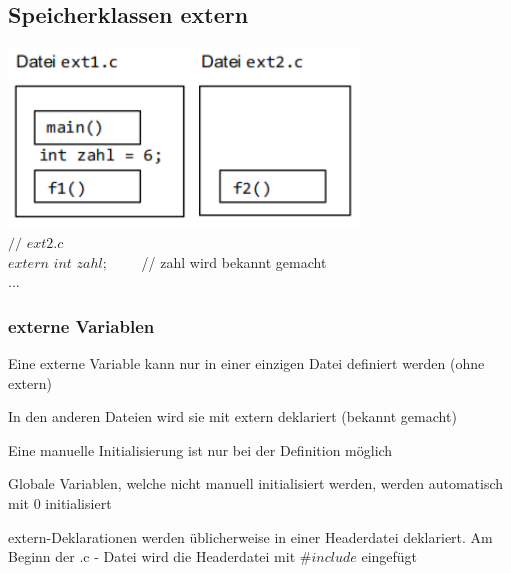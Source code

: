 			\subsection{Speicherklassen extern}
				\begin{minipage}[c]{9 cm}
					\includegraphics[width=0.7\textwidth]{pics/Speicherklasse_extern.png}\\
					$//$ $ext2.c$\\
					$extern$ $int$ $zahl;$ \ \ \ \ // zahl wird bekannt gemacht\\
					...
				\end{minipage}
				\hspace*{0.5cm}	
				\begin{minipage}[c]{9 cm}
					\vspace*{-0.4cm}
					\subsubsection{externe Variablen}
						\begin{compactitem}
							\item Eine externe Variable kann nur in einer einzigen Datei definiert werden (ohne
							extern)
							\item In den anderen Dateien wird sie mit extern deklariert (bekannt gemacht)
							\item Eine manuelle Initialisierung ist nur bei der Definition möglich
							\item Globale Variablen, welche nicht manuell initialisiert werden, werden
							automatisch mit 0 initialisiert
							\item extern-Deklarationen werden üblicherweise in einer Headerdatei deklariert. Am Beginn der .c - Datei wird die Headerdatei mit $\#include$ eingefügt
						\end{compactitem}
				\end{minipage}	
